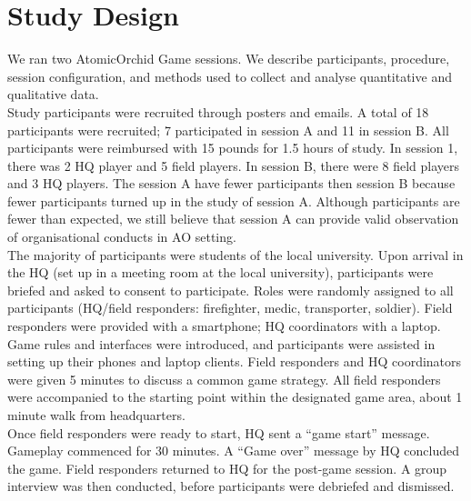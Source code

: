 
\section{Study Design}
We ran two AtomicOrchid Game sessions. We describe participants, procedure, session configuration, and methods used to collect and analyse quantitative and qualitative data.\\

Study participants were recruited through posters and emails. A total of 18 participants were recruited; 7 participated in session A and 11 in session B. All participants were reimbursed with 15 pounds for 1.5 hours of study. In session 1, there was 2 HQ player and 5 field players. In session B, there were 8 field players and 3 HQ players. The session A have fewer participants then session  B because fewer participants turned up in the study of session A. Although participants are fewer than expected, we still believe that session A can provide valid observation of organisational conducts in \ac{AO} setting.\\

The majority of participants were students of the local university. Upon arrival in the HQ (set up in a meeting room at the local university), participants were briefed and asked to consent to participate. Roles were randomly assigned to all participants (HQ/field responders: firefighter, medic, transporter, soldier). Field responders were provided with a smartphone; HQ coordinators with a laptop. Game rules and interfaces were introduced, and participants were assisted in setting up their phones and laptop clients. Field responders and HQ coordinators were given 5 minutes to discuss a common game strategy. All field responders were accompanied to the starting point within the designated game area, about 1 minute walk from headquarters.\\

Once field responders were ready to start, HQ sent a ``game start'' message. Gameplay commenced for 30 minutes. A ``Game over'' message by HQ concluded the game. Field responders returned to HQ for the post-game session. A group interview was then conducted, before participants were debriefed and dismissed.\\

